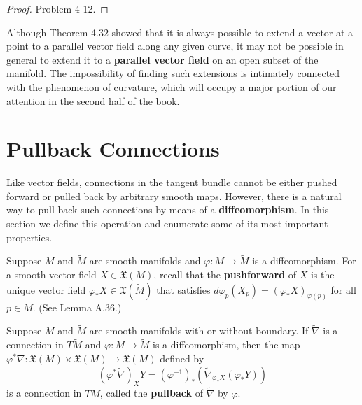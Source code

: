 \begin{proof}
Problem 4-12.
\end{proof}

Although Theorem 4.32 showed that it is always possible to extend a vector at a point to a parallel vector field along any given curve, it may not be possible in general to extend it to a \textbf{parallel vector field} on an open subset of the manifold. The impossibility of finding such extensions is intimately connected with the phenomenon of curvature, which will occupy a major portion of our attention in the second half of the book.

\section{Pullback Connections}

Like vector fields, connections in the tangent bundle cannot be either pushed forward or pulled back by arbitrary smooth maps. However, there is a natural way to pull back such connections by means of a \textbf{diffeomorphism}. In this section we define this operation and enumerate some of its most important properties.

Suppose $M$ and $\tilde{M}$ are smooth manifolds and $\varphi : M \to \tilde{M}$ is a diffeomorphism. For a smooth vector field $X \in \mathfrak{X}(M)$, recall that the \textbf{pushforward} of $X$ is the unique vector field $\varphi_* X \in \mathfrak{X}(\tilde{M})$ that satisfies $d\varphi_p(X_p) = (\varphi_* X)_{\varphi(p)}$ for all $p \in M$. (See Lemma A.36.)

\begin{lemma}
\label{lem:pullback-connection}
Suppose $M$ and $\tilde{M}$ are smooth manifolds with or without boundary. If $\tilde{\nabla}$ is a connection in $T\tilde{M}$ and $\varphi : M \to \tilde{M}$ is a diffeomorphism, then the map $\varphi^* \tilde{\nabla} : \mathfrak{X}(M) \times \mathfrak{X}(M) \to \mathfrak{X}(M)$ defined by
\begin{equation}
(\varphi^* \tilde{\nabla})_X Y = (\varphi^{-1})_* \left( \tilde{\nabla}_{\varphi_* X} (\varphi_* Y) \right) \tag{4.26}
\end{equation}
is a connection in $TM$, called the \textbf{pullback} of $\tilde{\nabla}$ by $\varphi$.
\end{lemma}

